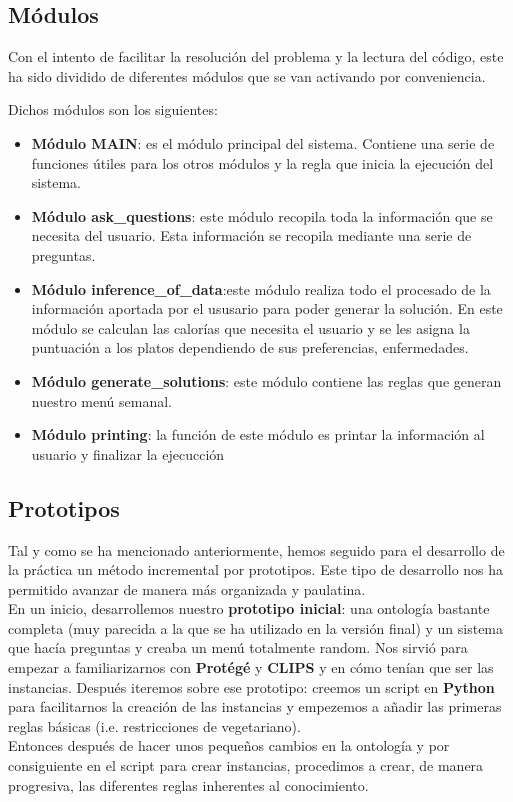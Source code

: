 \documentclass[12]{article}
\begin{document}
\subsection{Módulos}
Con el intento de facilitar la resolución del problema y la lectura del código, este ha sido dividido de diferentes módulos que se van activando por conveniencia.
\par
Dichos módulos son los siguientes:
\begin{itemize}
	\item \textbf{Módulo MAIN}: es el módulo principal del sistema. Contiene una serie de funciones útiles para los otros módulos y la regla que inicia la ejecución del sistema. 
	\item \textbf{Módulo ask\_questions}: este módulo recopila toda la información que se necesita del usuario. Esta información se recopila mediante una serie de preguntas. 
	\item \textbf{Módulo inference\_of\_data}:este módulo realiza todo el procesado de la información aportada por el ususario para poder generar la solución. En este módulo se calculan las calorías que necesita el usuario y se les asigna la puntuación a los platos dependiendo de sus preferencias, enfermedades.  
	\item \textbf{Módulo generate\_solutions}: este módulo contiene las reglas que generan nuestro menú semanal.
	\item \textbf{Módulo printing}: la función de este módulo es printar la información al usuario y finalizar la ejecucción
\end{itemize}



\subsection{Prototipos}
Tal y como se ha mencionado anteriormente, hemos seguido para el desarrollo de la práctica un método incremental por prototipos. Este tipo de desarrollo nos ha permitido avanzar de manera más organizada y paulatina. 
\\
En un inicio, desarrollemos nuestro \textbf{prototipo inicial}: una ontología bastante completa (muy parecida a la que se ha utilizado en la versión final) y un sistema que hacía preguntas y creaba un menú totalmente random.  Nos sirvió para empezar a familiarizarnos con \textbf{Protégé} y \textbf{CLIPS} y en cómo tenían que ser las instancias. Después iteremos sobre ese prototipo: creemos un script en \textbf{Python} para facilitarnos la creación de las instancias y empezemos a añadir las primeras reglas básicas (i.e. restricciones de vegetariano). 
\\
Entonces después de hacer unos pequeños cambios en la ontología y por consiguiente en el script para crear instancias, procedimos a crear, de manera progresiva, las diferentes reglas inherentes al conocimiento.  
\end{document}
